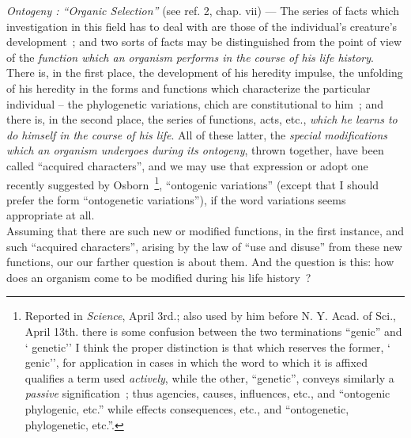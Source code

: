 \documentclass[11pt,twoside,a4paper]{article}
\begin{document}
\emph{Ontogeny : ``Organic Selection''} (see ref. 2, chap. vii) --- The series of facts which investigation in this field has to deal with are those of the individual's creature's development~; and two sorts of facts may be distinguished from the point of view of the \emph{function which an organism performs in the course of his life history}. There is, in the first place, the development of his heredity impulse, the unfolding of his heredity in the forms and functions which characterize the particular individual -- the phylogenetic variations, chich are constitutional to him~; and there is, in the second place, the series of functions, acts, etc., \emph{which he learns to do himself in the course of his life}. All of these latter, the \emph{special modifications which an organism undergoes during its ontogeny}, thrown together, have been called ``acquired characters'', and we may use that expression or adopt one recently suggested by Osborn~\footnote{Reported in \emph{Science}, April 3rd.; also used by him before N. Y. Acad. of Sci., April 13th. there is some confusion between the two terminations ``genic'' and ` genetic'' I think the proper distinction is that which reserves the former, ` genic'', for application in cases in which the word to which it is affixed qualifies a term used \emph{actively}, while the other, ``genetic'', conveys similarly a \emph{passive} signification~; thus agencies, causes, influences, etc., and ``ontogenic phylogenic, etc.'' while effects consequences, etc., and ``ontogenetic, phylogenetic, etc.''. }, ``ontogenic variations'' (except that I should prefer the form ``ontogenetic variations''), if the word variations seems appropriate at all.~\\

Assuming that there are such new or modified functions, in the first instance, and such ``acquired characters'', arising by the law of ``use and disuse'' from these new functions, our our farther question is about them. And the question is this: how does an organism come to be modified during his life history~?
\end{document}

